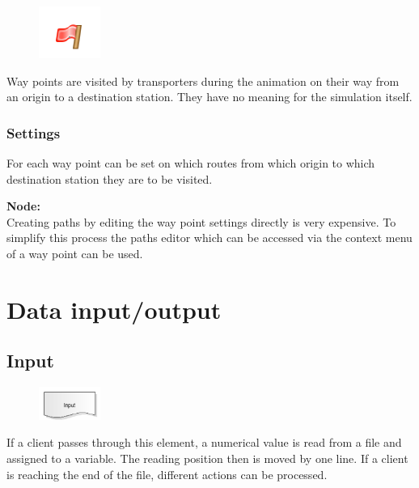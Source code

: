 \begin{figure}
\vspace{-22pt}
\includegraphics[width=2cm]{imageModelElementWayPoint.png}
\vspace{-22pt}
\end{figure}

Way points are visited by transporters during the animation on their way from an 
origin to a destination station. They have no meaning for the simulation itself.

\subsection*{Settings}

For each way point can be set on which routes from which origin to which
destination station they are to be visited.

\textbf{Node:}~\\
Creating paths by editing the way point settings directly is very expensive.
To simplify this process the paths editor 
which can be accessed via the context menu of a way point can be used.





\chapter{Data input/output}

\section{Input}
\label{ref:ModelElementInput}

\begin{figure}
\vspace{-22pt}
\includegraphics[width=2cm]{imageModelElementInput.png}
\vspace{-22pt}
\end{figure}

If a client passes through this element, a numerical value is read from a file
and assigned to a variable. The reading position then is moved by one line.
If a client is reaching the end of the file, different actions can be processed.


